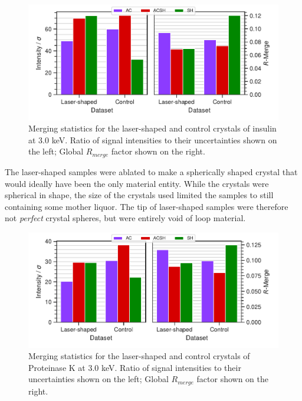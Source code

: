 \begin{figure}[h]
    \centering
    \includegraphics{plots/exp2/ins_stats.pdf}
    \caption{Merging statistics for the laser-shaped and control crystals of insulin at 3.0 \unit{keV}. Ratio of signal intensities to their uncertainties shown on the left; Global $R_{merge}$ factor shown on the right.}
    \label{fig:insulin}
\end{figure}

The laser-shaped samples were ablated to make a spherically shaped crystal that would ideally have been the only material entity. While the crystals were spherical in shape, the size of the crystals used limited the samples to still containing some mother liquor. The tip of laser-shaped samples were therefore not \textit{perfect} crystal spheres, but were entirely void of loop material.


\begin{figure}[h]
    \centering
    \includegraphics{plots/exp2/prot_stats.pdf}
    \caption{Merging statistics for the laser-shaped and control crystals of Proteinase K at 3.0 \unit{keV}. Ratio of signal intensities to their uncertainties shown on the left; Global $R_{merge}$ factor shown on the right.}
    \label{fig:proteinasek}
\end{figure}

